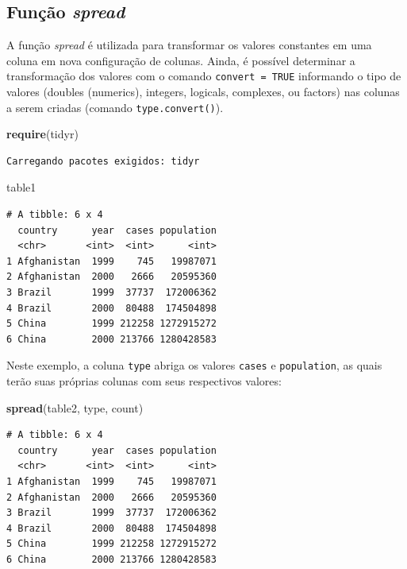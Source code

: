 \documentclass[12pt,brazil,oneside]{book}
\newenvironment{Shaded}{\begin{snugshade}}{\end{snugshade}}
\newcommand{\KeywordTok}[1]{\textcolor[rgb]{0.13,0.29,0.53}{\textbf{#1}}}
\newcommand{\NormalTok}[1]{#1}
\begin{document}
\hypertarget{funcao-spread}{%
\subsection{\texorpdfstring{Função \emph{spread}}{Função spread}}\label{funcao-spread}}

A função \emph{spread} é utilizada para transformar os valores constantes em uma coluna em nova configuração de colunas. Ainda, é possível determinar a transformação dos valores com o comando \texttt{convert\ =\ TRUE} informando o tipo de valores (doubles (numerics), integers, logicals, complexes, ou factors) nas colunas a serem criadas (comando \texttt{type.convert()}).

\begin{Shaded}
\begin{Highlighting}[]
\KeywordTok{require}\NormalTok{(tidyr)}
\end{Highlighting}
\end{Shaded}

\begin{verbatim}
Carregando pacotes exigidos: tidyr
\end{verbatim}

\begin{Shaded}
\begin{Highlighting}[]
\NormalTok{table1}
\end{Highlighting}
\end{Shaded}

\begin{verbatim}
# A tibble: 6 x 4
  country      year  cases population
  <chr>       <int>  <int>      <int>
1 Afghanistan  1999    745   19987071
2 Afghanistan  2000   2666   20595360
3 Brazil       1999  37737  172006362
4 Brazil       2000  80488  174504898
5 China        1999 212258 1272915272
6 China        2000 213766 1280428583
\end{verbatim}

Neste exemplo, a coluna \texttt{type} abriga os valores \texttt{cases} e \texttt{population}, as quais terão suas próprias colunas com seus respectivos valores:

\begin{Shaded}
\begin{Highlighting}[]
\KeywordTok{spread}\NormalTok{(table2, type, count)}
\end{Highlighting}
\end{Shaded}

\begin{verbatim}
# A tibble: 6 x 4
  country      year  cases population
  <chr>       <int>  <int>      <int>
1 Afghanistan  1999    745   19987071
2 Afghanistan  2000   2666   20595360
3 Brazil       1999  37737  172006362
4 Brazil       2000  80488  174504898
5 China        1999 212258 1272915272
6 China        2000 213766 1280428583
\end{verbatim}
\end{document}

